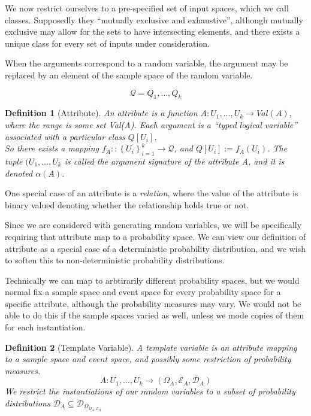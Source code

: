 \documentclass[11pt]{article}
\newtheorem{definition}{Definition}
\begin{document}
We now restrict ourselves to a pre-specified set of input spaces, which we call classes.  Supposedly they ``mutually exclusive and exhaustive'', although mutually exclusive may allow for the sets to have intersecting elements, and there exists a unique class for every set of inputs under consideration.

When the arguments correspond to a random variable, the argument may be replaced by an element of the sample space of the random variable.

\begin{equation}
  \mathcal{Q} = Q_1, \ldots, Q_k
  \label{Classes}
\end{equation}

\begin{definition}[Attribute]
  An attribute is a function $A \colon U_1, \ldots, U_k \rightarrow Val(A)$, where the range is some set Val(A). 
  Each argument is a ``typed logical variable'' associated with a particular class $Q[U_i]$. \\
  So there exists a mapping $f_A \colon: \left\{ U_i \right\}_{i=1}^{k} \rightarrow \mathcal{Q}$, and $Q[U_i] := f_A(U_i)$. 
  The tuple $(U_1,\ldots,U_k$ is called the \emph{argument signature} of the attribute A, and it is denoted $\alpha(A)$.
\end{definition}

One special case of an attribute is a \emph{relation}, where the value of the attribute is binary valued denoting whether the relationship holds true or not.  

Since we are considered with generating random variables, we will be specifically requiring that attribute map to a probability space. 
We can view our definition of attribute as a special case of a deterministic probability distribution, and we wish to soften this to non-deterministic probability distributions. 

Technically we can map to arbtirarily different probability spaces, but we would normal fix a sample space and event space for every probability space for a specific attribute, although the probability measures may vary. 
We would not be able to do this if the sample spaces varied as well, unless we mode copies of them for each instantiation.

\begin{definition}[Template Variable]
  A template variable is an attribute mapping to a sample space and event space, and possibly some restriction of probability measures.
  \begin{equation}
    A \colon U_1, \ldots, U_k \rightarrow ( \Omega_{ A }, \mathcal{E}_{ A },\mathcal{D}_{ A} )
    \label{template variable}
  \end{equation}
  We restrict the instantiations of our random variables to a subset of probability distributions $\mathcal{D}_{ A } \subseteq \mathcal{D}_{ \Omega_{ \Omega_{A},\mathcal{E}_{ A } } }$
\end{definition}
\end{document}
